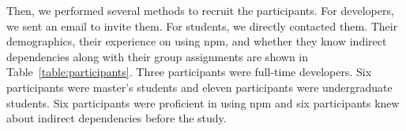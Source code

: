 \documentclass[conference]{IEEEtran}
\begin{document}
	Then, we performed several methods to recruit the participants. For developers, we sent an email to invite them. For students, we directly contacted them.  Their demographics, their experience on using npm, and whether they know indirect dependencies along with their group assignments are shown in Table~\ref{table:participants}. Three participants were full-time developers. Six participants were master's students and eleven participants were undergraduate students. Six participants were proficient in using npm and six participants knew about indirect dependencies before the study.
	
	
	
	\begin{table}[tb]
		\caption{Participants’ Demographic}
		\centering
\end{table}
\end{document}

